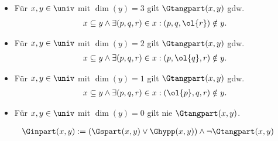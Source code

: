 \begin{hyp}\label{satz:tangpart}
    \begin{itemize}\ 
        \item Für $x,y \in \univ$ mit $\dim(y) = 3$ gilt $\Gtangpart(x,y)$ gdw.
            \begin{align*}
                x \subseteq y \land \exists (p,q,r) \in x : (p,q,\ol{r}) \notin y.
            \end{align*}
        \item Für $x,y \in \univ$ mit $\dim(y) = 2$ gilt $\Gtangpart(x,y)$ gdw.
            \begin{align*}
                x \subseteq y \land \exists (p,q,r) \in x : (p,\ol{q},r) \notin y.
            \end{align*}
        \item Für $x,y \in \univ$ mit $\dim(y) = 1$ gilt $\Gtangpart(x,y)$ gdw.
            \begin{align*}
                x \subseteq y \land \exists (p,q,r) \in x : (\ol{p},q,r) \notin y.
            \end{align*}
        \item Für $x,y \in \univ$ mit $\dim(y) = 0$ gilt nie $\Gtangpart(x,y)$.
    \end{itemize}
\end{hyp}



\begin{erin}
    \begin{align*}
        \Ginpart(x, y) := (\Gspart(x,y) \vee \Ghypp(x,y)) \land \neg \Gtangpart(x, y)
    \end{align*}
\end{erin}

